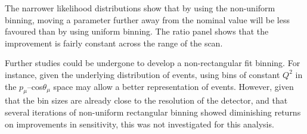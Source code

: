 The narrower likelihood distributions show that by using the non-uniform binning, moving a parameter further away from the nominal value will be less favoured than by using uniform binning. The ratio panel shows that the improvement is fairly constant across the range of the scan.

Further studies could be undergone to develop a non-rectangular fit binning. For instance, given the underlying distribution of events, using bins of constant $Q^2$ in the $p_{\mu}$--cos$\theta_{\mu}$ space may allow a better representation of events. However, given that the bin sizes are already close to the resolution of the detector, and that several iterations of non-uniform rectangular binning showed diminishing returns on improvements in sensitivity, this was not investigated for this analysis.

